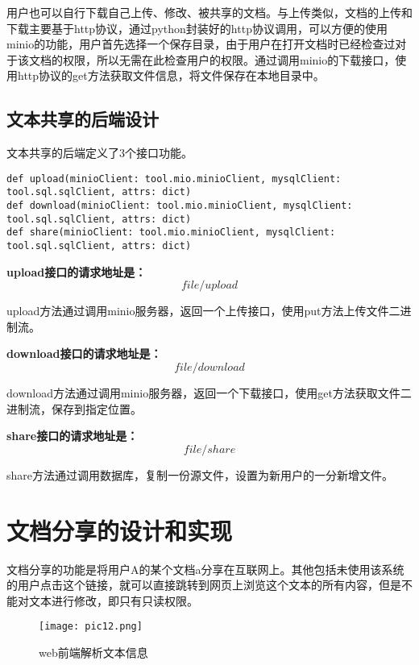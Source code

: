 \documentclass[forprint]{software}
\begin{document}
用户也可以自行下载自己上传、修改、被共享的文档。与上传类似，文档的上传和下载主要基于http协议，通过python封装好的http协议调用，可以方便的使用minio的功能，用户首先选择一个保存目录，由于用户在打开文档时已经检查过对于该文档的权限，所以无需在此检查用户的权限。通过调用minio的下载接口，使用http协议的get方法获取文件信息，将文件保存在本地目录中。

\subsection{文本共享的后端设计}

文本共享的后端定义了3个接口功能。

\begin{lstlisting}
def upload(minioClient: tool.mio.minioClient, mysqlClient: tool.sql.sqlClient, attrs: dict)
def download(minioClient: tool.mio.minioClient, mysqlClient: tool.sql.sqlClient, attrs: dict)
def share(minioClient: tool.mio.minioClient, mysqlClient: tool.sql.sqlClient, attrs: dict)
\end{lstlisting}

\textbf{upload接口的请求地址是：}
\begin{equation*}
	file/upload
\end{equation*}

upload方法通过调用minio服务器，返回一个上传接口，使用put方法上传文件二进制流。

\textbf{download接口的请求地址是：}
\begin{equation*}
	file/download
\end{equation*}

download方法通过调用minio服务器，返回一个下载接口，使用get方法获取文件二进制流，保存到指定位置。

\textbf{share接口的请求地址是：}
\begin{equation*}
	file/share
\end{equation*}

share方法通过调用数据库，复制一份源文件，设置为新用户的一分新增文件。

\section{文档分享的设计和实现}

文档分享的功能是将用户A的某个文档a分享在互联网上。其他包括未使用该系统的用户点击这个链接，就可以直接跳转到网页上浏览这个文本的所有内容，但是不能对文本进行修改，即只有只读权限。

\begin{figure}[!htbp]
	\centering
	\texttt{[image: pic12.png]}
	\caption{web前端解析文本信息}
	\label{fig:12}
\end{figure}
\end{document}
